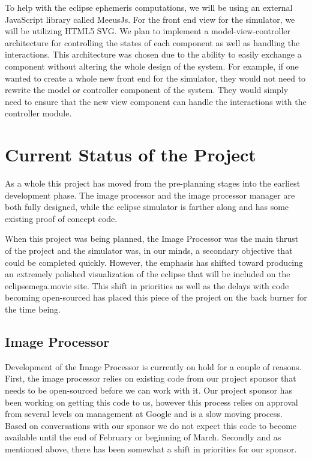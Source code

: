 \documentclass[10pt, onecolumn, draftclsnofoot, letterpaper, compsoc]{IEEEtran}
\begin{document}
To help with the eclipse ephemeris computations, we will be using an external
JavaScript library called MeeusJs. For the front end view for the simulator,
we will be utilizing HTML5 SVG. We plan to implement a model-view-controller
architecture for controlling the states of each component as well as handling
the interactions. This architecture was chosen due to the ability to easily
exchange a component without altering the whole design of the system. For
example, if one wanted to create a whole new front end for the simulator,
they would not need to rewrite the model or controller component of the system.
They would simply need to ensure that the new view component can handle the
interactions with the controller module.


\section{Current Status of the Project}

As a whole this project has moved from the pre-planning stages into the earliest
development phase. The image processor and the image processor manager are both
fully designed, while the eclipse simulator is farther along and has some existing proof of
concept code.

When this project was being planned,
the Image Processor was the main thrust of the project and the simulator was, in
our minds, a secondary objective that could be completed quickly. However, the
emphasis has shifted toward producing an extremely polished visualization of the
eclipse that will be included on the eclipsemega.movie site. This shift in
priorities as well as the delays with code becoming open-sourced has placed this
piece of the project on the back burner for the time being.

\subsection{Image Processor}

Development of the Image Processor is currently on hold for a couple of reasons.
First, the image processor relies on existing code from our project sponsor that
needs to be open-sourced before we can work with it. Our project sponsor has
been working on getting this code to us, however this process relies on approval
from several levels on management at Google and is a slow moving process. Based
on conversations with our sponsor we do not expect this code to become available
until the end of February or beginning of March. Secondly and as mentioned above,
there has been somewhat a shift in priorities for our sponsor.
\end{document}
